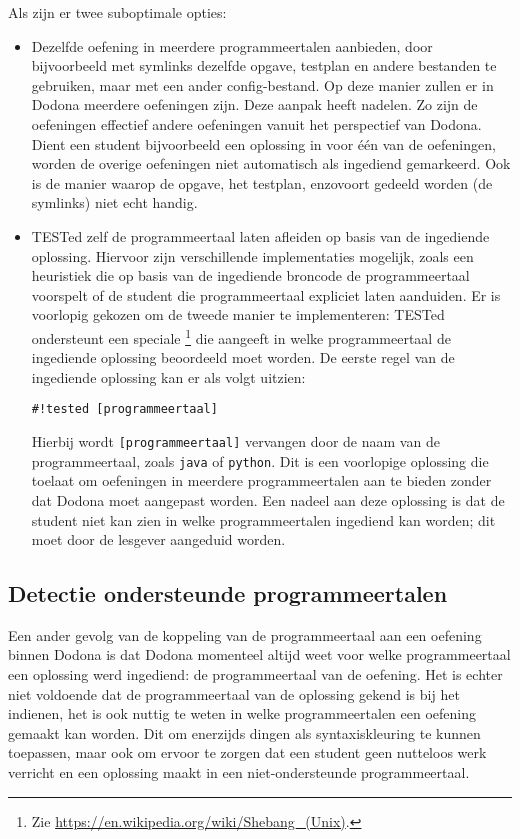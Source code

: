 Als  zijn er twee suboptimale opties:
\begin{itemize}
    \item Dezelfde oefening in meerdere programmeertalen aanbieden, door bijvoorbeeld met symlinks dezelfde opgave, testplan en andere bestanden te gebruiken, maar met een ander config-bestand.
    Op deze manier zullen er in Dodona meerdere oefeningen zijn.
    Deze aanpak heeft nadelen.
    Zo zijn de oefeningen effectief andere oefeningen vanuit het perspectief van Dodona.
    Dient een student bijvoorbeeld een oplossing in voor één van de oefeningen, worden de overige oefeningen niet automatisch als ingediend gemarkeerd.
    Ook is de manier waarop de opgave, het testplan, enzovoort gedeeld worden (de symlinks) niet echt handig.
    \item TESTed zelf de programmeertaal laten afleiden op basis van de ingediende oplossing.
    Hiervoor zijn verschillende implementaties mogelijk, zoals een heuristiek die op basis van de ingediende broncode de programmeertaal voorspelt of de student die programmeertaal expliciet laten aanduiden.
    Er is voorlopig gekozen om de tweede manier te implementeren: TESTed ondersteunt een speciale \footnote{Zie \url{https://en.wikipedia.org/wiki/Shebang_(Unix)}.} die aangeeft in welke programmeertaal de ingediende oplossing beoordeeld moet worden.
    De eerste regel van de ingediende oplossing kan er als volgt uitzien:
    \begin{verbatim}
#!tested [programmeertaal]
    \end{verbatim}
    Hierbij wordt \texttt{[programmeertaal]} vervangen door de naam van de programmeertaal, zoals \texttt{java} of \texttt{python}.
    Dit is een voorlopige oplossing die toelaat om oefeningen in meerdere programmeertalen aan te bieden zonder dat Dodona moet aangepast worden.
    Een nadeel aan deze oplossing is dat de student niet kan zien in welke programmeertalen ingediend kan worden;
    dit moet door de lesgever aangeduid worden.
\end{itemize}

\subsection{Detectie ondersteunde programmeertalen}\label{subsec:detectie-beschikbare-programmeertalen}

Een ander gevolg van de koppeling van de programmeertaal aan een oefening binnen Dodona is dat Dodona momenteel altijd weet voor welke programmeertaal een oplossing werd ingediend: de programmeertaal van de oefening.
Het is echter niet voldoende dat de programmeertaal van de oplossing gekend is bij het indienen,
het is ook nuttig te weten in welke programmeertalen een oefening gemaakt kan worden.
Dit om enerzijds dingen als syntaxiskleuring te kunnen toepassen, maar ook om ervoor te zorgen dat een student geen nutteloos werk verricht en een oplossing maakt in een niet-ondersteunde programmeertaal.

